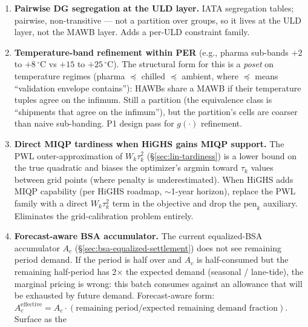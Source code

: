 \documentclass[11pt,a4paper]{article}
\theoremstyle{definition}
\begin{document}
\begin{enumerate}
        two flights / MAWBs (capacity / partial-roll). Option 1 (virtual
        sub-HAWBs at intake, parent-HAWB binding for billing) preferred ---
        the MILP is unchanged.
  \item \label{item:pairwise-dg-segregation} \textbf{Pairwise DG segregation
        at the ULD layer.} IATA segregation tables; pairwise, non-transitive
        --- not a partition over groups, so it lives at the ULD layer, not
        the MAWB layer. Adds a per-ULD constraint family.
  \item \label{item:temp-band-refinement} \textbf{Temperature-band
        refinement within PER} (e.g., pharma sub-bands $+2$ to $+8\,^\circ$C
        vs $+15$ to $+25\,^\circ$C). The structural form for this is a
        \emph{poset} on temperature regimes (pharma $\preceq$ chilled
        $\preceq$ ambient, where $\preceq$ means ``validation envelope
        contains''): HAWBs share a MAWB if their temperature tuples agree
        on the infimum. Still a partition (the equivalence class is
        ``shipments that agree on the infimum''), but the partition's
        cells are coarser than naive sub-banding. P1 design pass for
        $g(\cdot)$ refinement.
  \item \label{item:miqp-tardiness} \textbf{Direct MIQP tardiness when
        HiGHS gains MIQP support.} The PWL outer-approximation of
        $W_k \tau_k^2$ (\S\ref{sec:lin-tardiness}) is a lower bound on
        the true quadratic and biases the optimizer's argmin toward
        $\tau_k$ values between grid points (where penalty is
        underestimated). When HiGHS adds MIQP capability (per HiGHS
        roadmap, $\sim$1-year horizon), replace the PWL family with a
        direct $W_k \tau_k^2$ term in the objective and drop the
        $\text{pen}_k$ auxiliary. Eliminates the grid-calibration
        problem entirely.
  \item \label{item:forecast-aware-accumulator} \textbf{Forecast-aware BSA
        accumulator.} The current equalized-BSA accumulator $A_c$
        (\S\ref{sec:bsa-equalized-settlement}) does not see remaining
        period demand. If the period is half over and $A_c$ is
        half-consumed but the remaining half-period has 2$\times$ the
        expected demand (seasonal / lane-tide), the marginal pricing is
        wrong: this batch consumes against an allowance that will be
        exhausted by future demand. Forecast-aware form:
        $A_c^{\text{effective}} = A_c \cdot (\text{remaining period} /
        \text{expected remaining demand fraction})$. Surface as the

\end{enumerate}
\end{document}
